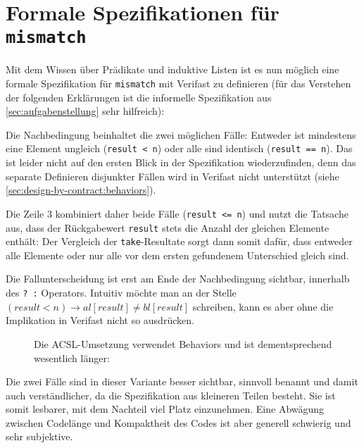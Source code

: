 \section{Formale Spezifikationen für \texttt{mismatch}}

Mit dem Wissen über Prädikate und induktive Listen ist es nun möglich eine formale Spezifikation für \lstinline{mismatch} mit Verifast
zu definieren (für das Verstehen der folgenden Erklärungen ist die informelle Spezifikation aus 
\ref{sec:aufgabenstellung} sehr hilfreich):



Die Nachbedingung beinhaltet die zwei möglichen Fälle: Entweder ist mindestens eine Element ungleich
(\lstinline{result < n}) oder alle sind identisch (\lstinline{result == n}). Das ist leider nicht auf den
ersten Blick in der Spezifikation wiederzufinden, denn das separate Definieren disjunkter Fällen wird in Verifast 
nicht unterstützt (siehe \ref{sec:design-by-contract:behaviors}). 

Die Zeile 3 kombiniert daher beide Fälle (\lstinline{result <= n}) und nutzt die Tatsache aus, dass
der Rückgabewert \lstinline{result} stets die Anzahl der gleichen Elemente enthält: Der Vergleich der
\lstinline{take}-Resultate sorgt dann somit dafür, dass entweder alle Elemente oder nur
alle vor dem ersten gefundenem Unterschied gleich sind. 

Die Fallunterscheidung ist erst am Ende der Nachbedingung sichtbar, innerhalb des \lstinline{? :} Operators.
Intuitiv möchte man an der Stelle \((result < n) \rightarrow al[result] \neq  bl[result]\)
schreiben, kann es aber ohne die Implikation in Verifast nicht so ausdrücken.

\begin{figure}[H]
Die ACSL-Umsetzung verwendet Behaviors und ist dementsprechend wesentlich länger:

\end{figure}

Die zwei Fälle sind in dieser Variante besser sichtbar, sinnvoll benannt und damit auch verständlicher, 
da die Spezifikation aus kleineren Teilen besteht. Sie ist somit lesbarer, mit dem Nachteil viel Platz einzunehmen.
Eine Abwägung zwischen Codelänge und Kompaktheit des Codes ist aber generell schwierig und sehr subjektive.

